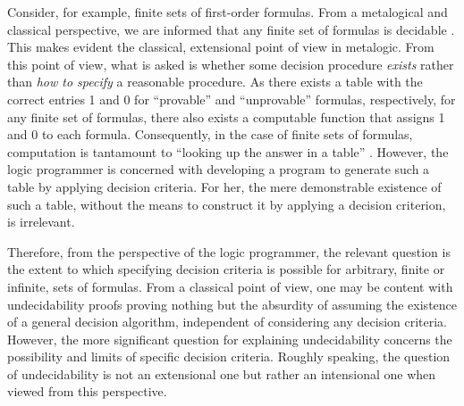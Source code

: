\documentclass[%
  manuscript=article,   %
  year=2024,
  volume=77,
  doi=10.59203/zfn.77.694,
]{zfn}
\begin{document}
Consider, for example, finite sets of first-order formulas. From a metalogical and classical perspective, we are informed that any finite set of formulas is decidable \parencite[cf.][p.1]{DrebenGoldfarb}. \label{metafinite}
This makes evident the classical, extensional point of view in metalogic. From this point of view, what is asked is whether some decision procedure \emph{exists} rather than \emph{how to specify} a reasonable procedure. As there exists a table with the correct entries 1 and 0 for ``provable'' and ``unprovable'' formulas, respectively, for any finite set of formulas, there also exists a computable function that assigns 1 and 0 to each formula. Consequently, in the case of finite sets of formulas, computation is tantamount to  ``looking up the answer in a table'' \parencite[][p.239]{Boerger_et_al}. However, the logic programmer is concerned with developing a program to generate such a table by applying decision criteria. For her, the mere demonstrable existence of such a table, without the means to construct it by applying a decision criterion, is irrelevant.

Therefore, from the  perspective of the logic programmer,
the relevant question is the extent to which specifying decision criteria is possible for arbitrary, finite or infinite, sets of formulas. From a
classical point of view, one may be content with undecidability proofs proving nothing but the absurdity of assuming the existence of a general decision algorithm, independent of considering any decision criteria. However, the more significant question for explaining undecidability 
concerns the possibility and limits of specific decision criteria. Roughly speaking, the question of undecidability is not an extensional one but rather an intensional one when viewed from this perspective.
\end{document}
